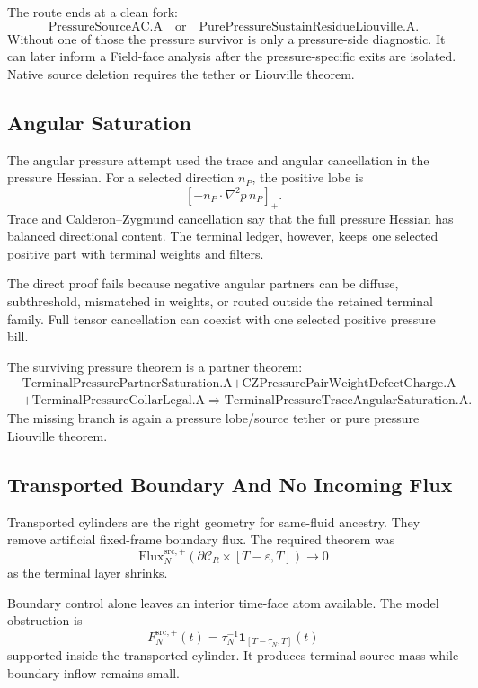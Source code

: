 The route ends at a clean fork:
\[
  \text{PressureSourceAC.A}
  \quad\text{or}\quad
  \text{PurePressureSustainResidueLiouville.A}.
\]
Without one of those the pressure survivor is only a pressure-side diagnostic.
It can later inform a Field-face analysis after the pressure-specific exits are
isolated.
Native source deletion requires the tether or Liouville theorem.

\subsection{Angular Saturation}

The angular pressure attempt used the trace and angular cancellation in the
pressure Hessian.
For a selected direction \(n_P\), the positive lobe is
\[
  [-n_P\cdot\nabla^2p\,n_P]_+ .
\]
Trace and Calderon--Zygmund cancellation say that the full pressure Hessian has
balanced directional content.
The terminal ledger, however, keeps one selected positive part with terminal
weights and filters.

The direct proof fails because negative angular partners can be diffuse,
subthreshold, mismatched in weights, or routed outside the retained terminal
family.
Full tensor cancellation can coexist with one selected positive pressure bill.

The surviving pressure theorem is a partner theorem:
\[
  \begin{aligned}
  &\text{TerminalPressurePartnerSaturation.A}
  +\text{CZPressurePairWeightDefectCharge.A}\\
  &+\text{TerminalPressureCollarLegal.A}
  \Longrightarrow
  \text{TerminalPressureTraceAngularSaturation.A}.
  \end{aligned}
\]
The missing branch is again a pressure lobe/source tether or pure pressure
Liouville theorem.

\subsection{Transported Boundary And No Incoming Flux}

Transported cylinders are the right geometry for same-fluid ancestry.
They remove artificial fixed-frame boundary flux.
The required theorem was
\[
  \mathrm{Flux}^{\mathrm{src},+}_N
  (\partial\mathcal C_R\times[T-\varepsilon,T])
  \to0
\]
as the terminal layer shrinks.

Boundary control alone leaves an interior time-face atom available.
The model obstruction is
\[
  F_N^{\mathrm{src},+}(t)
  =
  \tau_N^{-1}\mathbf 1_{[T-\tau_N,T]}(t)
\]
supported inside the transported cylinder.
It produces terminal source mass while boundary inflow remains small.

